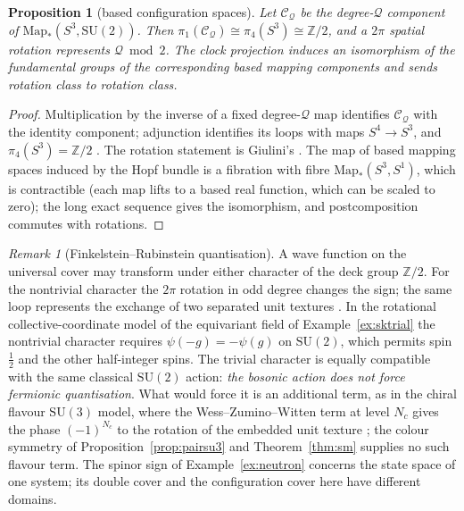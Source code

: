 \documentclass[aps,pra,onecolumn,superscriptaddress,nofootinbib,10pt]{revtex4-2}
\newtheorem{proposition}[theorem]{Proposition}
\theoremstyle{definition}
\theoremstyle{remark}
\newtheorem{remark}[theorem]{Remark}
\newcommand{\Z}{\mathbb{Z}}
\newcommand{\SU}{\mathrm{SU}}
\begin{document}
\begin{proposition}[based configuration spaces]\label{prop:skconfig}
Let $\mathcal C_{\mathcal Q}$ be the degree-$\mathcal Q$ component of $\mathrm{Map}_*(S^3,\SU(2))$.  Then $\pi_1(\mathcal C_{\mathcal Q})\cong\pi_4(S^3)\cong\Z/2$, and a
$2\pi$ spatial rotation represents $\mathcal Q\bmod2$.  The clock projection induces an isomorphism of the fundamental
groups of the corresponding based mapping components and sends rotation class to rotation class.
\end{proposition}
\begin{proof}
Multiplication by the inverse of a fixed degree-$\mathcal Q$ map identifies $\mathcal C_{\mathcal Q}$ with the identity component;
adjunction identifies its loops with maps $S^4\to S^3$, and $\pi_4(S^3)=\Z/2$ \cite[Ch.~I]{n6:toda}.  The rotation
statement is Giulini's \cite{n6:giulini}.  The map of based mapping spaces induced by the Hopf bundle is a
fibration with fibre $\mathrm{Map}_*(S^3,S^1)$, which is contractible (each map lifts to a based real function, which
can be scaled to zero); the long exact sequence gives the isomorphism, and postcomposition commutes with
rotations.
\end{proof}
\begin{remark}[Finkelstein--Rubinstein quantisation]\label{rem:fr}
A wave function on the universal cover may transform under either character of the deck group $\Z/2$.
For the nontrivial character the $2\pi$ rotation in odd degree changes the sign; the same loop represents
the exchange of two separated unit textures \cite{n6:fr-original,n6:krusch}.  In the rotational
collective-coordinate model of the equivariant field of Example~\ref{ex:sktrial} the nontrivial character
requires $\psi(-g)=-\psi(g)$ on $\SU(2)$, which permits spin $\tfrac12$ and the other half-integer spins.  The
trivial character is equally compatible with the same classical $\SU(2)$ action: \emph{the bosonic action does
not force fermionic quantisation}.  What would force it is an additional term, as in the chiral flavour
$\SU(3)$ model, where the Wess--Zumino--Witten term at level $N_c$ gives the phase $(-1)^{N_c}$ to the rotation of the
embedded unit texture \cite{n6:witten-current,n6:witten-baryons}; the colour symmetry of
Proposition~\ref{prop:pairsu3} and Theorem~\ref{thm:sm} supplies no such flavour term.  The spinor sign of
Example~\ref{ex:neutron} concerns the state space of one system; its double cover and the configuration
cover here have different domains.
\end{remark}
\end{document}

